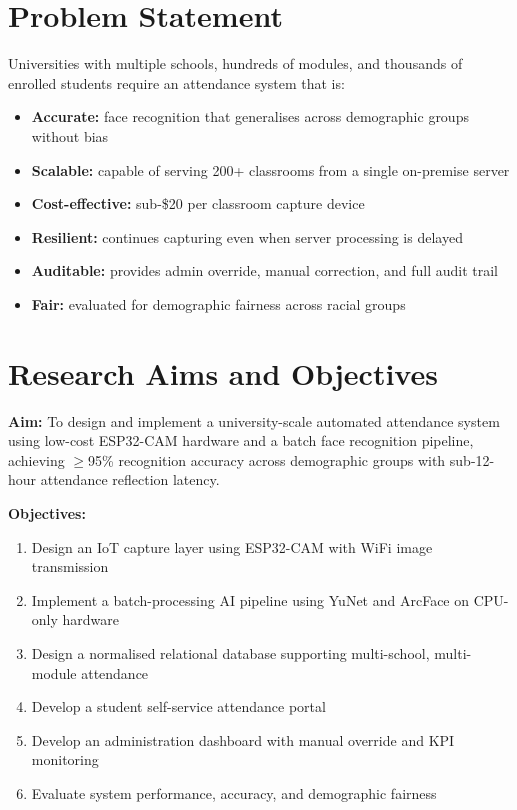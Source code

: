 \documentclass[12pt,a4paper]{report}
\begin{document}
\section{Problem Statement}
Universities with multiple schools, hundreds of modules, and thousands of enrolled students require an attendance system that is:
\begin{itemize}
  \item \textbf{Accurate:} face recognition that generalises across demographic groups without bias
  \item \textbf{Scalable:} capable of serving 200+ classrooms from a single on-premise server
  \item \textbf{Cost-effective:} sub-\$20 per classroom capture device
  \item \textbf{Resilient:} continues capturing even when server processing is delayed
  \item \textbf{Auditable:} provides admin override, manual correction, and full audit trail
  \item \textbf{Fair:} evaluated for demographic fairness across racial groups
\end{itemize}

\section{Research Aims and Objectives}
\textbf{Aim:} To design and implement a university-scale automated attendance system using low-cost ESP32-CAM hardware and a batch face recognition pipeline, achieving $\geq$95\% recognition accuracy across demographic groups with sub-12-hour attendance reflection latency.

\textbf{Objectives:}
\begin{enumerate}
  \item Design an IoT capture layer using ESP32-CAM with WiFi image transmission
  \item Implement a batch-processing AI pipeline using YuNet and ArcFace on CPU-only hardware
  \item Design a normalised relational database supporting multi-school, multi-module attendance
  \item Develop a student self-service attendance portal
  \item Develop an administration dashboard with manual override and KPI monitoring
  \item Evaluate system performance, accuracy, and demographic fairness
\end{enumerate}
\end{document}
